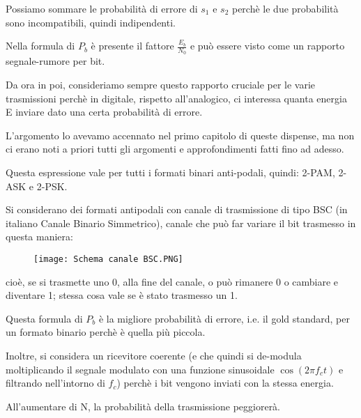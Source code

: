 \newpage 

Possiamo sommare le probabilità di errore di $s_1$ e $s_2$ perchè le due probabilità sono incompatibili, 
quindi indipendenti. \newline 

Nella formula di $P_b$ è presente il fattore $\frac{E_b}{N_0}$ e può essere visto come un rapporto segnale-rumore per bit. \newline 

\begin{tcolorbox}
Da ora in poi, consideriamo sempre questo rapporto cruciale per le varie trasmissioni perchè in digitale, 
rispetto all'analogico, ci interessa quanta energia E inviare dato una certa probabilità di errore. \newline 

L'argomento lo avevamo accennato nel primo capitolo di queste dispense, 
ma non ci erano noti a priori tutti gli argomenti e approfondimenti fatti fino ad adesso.
\end{tcolorbox}

Questa espressione vale per tutti i formati binari anti-podali, quindi: 
2-PAM, 2-ASK e 2-PSK. \newline 

Si considerano dei formati antipodali con canale di trasmissione di tipo BSC (in italiano Canale Binario Simmetrico), 
canale che può far variare il bit trasmesso in questa maniera: 

\begin{figure}[h]
    \centering
    \texttt{[image: Schema canale BSC.PNG]}
\end{figure}

cioè, se si trasmette uno 0, alla fine del canale, o può rimanere 0 o cambiare e diventare 1; 
stessa cosa vale se è stato trasmesso un 1. \newline 

Questa formula di $P_b$ è la migliore probabilità di errore, i.e. il gold standard, 
per un formato binario perchè è quella più piccola. \newline 

Inoltre, si considera un ricevitore coerente (e che quindi si de-modula moltiplicando il segnale modulato con una funzione sinusoidale $\cos(2 \pi f_c t)$ e filtrando nell'intorno di $f_c$) 
perchè i bit vengono inviati con la stessa energia. \newline 

All'aumentare di N, la probabilità della trasmissione peggiorerà. \newline 

